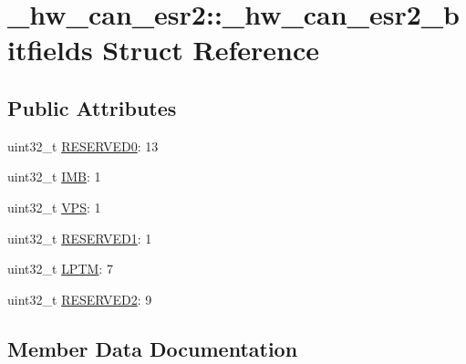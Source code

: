 \hypertarget{struct__hw__can__esr2_1_1__hw__can__esr2__bitfields}{}\section{\+\_\+hw\+\_\+can\+\_\+esr2\+:\+:\+\_\+hw\+\_\+can\+\_\+esr2\+\_\+bitfields Struct Reference}
\label{struct__hw__can__esr2_1_1__hw__can__esr2__bitfields}
\subsection*{Public Attributes}
\begin{DoxyCompactItemize}
\item 
uint32\+\_\+t \hyperlink{struct__hw__can__esr2_1_1__hw__can__esr2__bitfields_af476f48f1a4b11775249117e72759774}{R\+E\+S\+E\+R\+V\+E\+D0}\+: 13
\item 
uint32\+\_\+t \hyperlink{struct__hw__can__esr2_1_1__hw__can__esr2__bitfields_abf25835c1405dd32782c6b32f68b21b5}{I\+MB}\+: 1
\item 
uint32\+\_\+t \hyperlink{struct__hw__can__esr2_1_1__hw__can__esr2__bitfields_ae7b53c722f5e368123bec5dc4db08ef4}{V\+PS}\+: 1
\item 
uint32\+\_\+t \hyperlink{struct__hw__can__esr2_1_1__hw__can__esr2__bitfields_a915d205d6d60f2305845046b95fe1f60}{R\+E\+S\+E\+R\+V\+E\+D1}\+: 1
\item 
uint32\+\_\+t \hyperlink{struct__hw__can__esr2_1_1__hw__can__esr2__bitfields_a06727fa722383e813c06269b7661dabe}{L\+P\+TM}\+: 7
\item 
uint32\+\_\+t \hyperlink{struct__hw__can__esr2_1_1__hw__can__esr2__bitfields_ae436f020c6728eafe23c59a92f0869e2}{R\+E\+S\+E\+R\+V\+E\+D2}\+: 9
\end{DoxyCompactItemize}


\subsection{Member Data Documentation}
